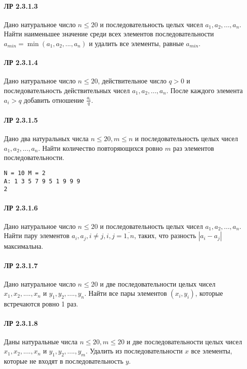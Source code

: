 \documentclass[12pt,a4paper]{report}
\begin{document}
\paragraph*{ЛР 2.3.1.3} Дано натуральное число $n \le 20$ и последовательность целых чисел $a_1, a_2, ..., a_n$. Найти наименьшее значение среди всех элементов последовательности $a_{min} = \min(a_1, a_2, ..., a_n)$ и удалить все элементы, равные $a_{min}$.
\paragraph*{ЛР 2.3.1.4} Дано натуральное число $n \le 20$, действительное число $q>0$ и последовательность действительных чисел $a_1, a_2, ..., a_n$. После каждого элемента $a_i > q$ добавить отношение $\frac {a_i}{q}$.
\paragraph*{ЛР 2.3.1.5} Дано два натуральных числа $n \le 20, m \le n$ и последовательность целых чисел $a_1, a_2, ..., a_n$. Найти количество повторяющихся ровно $m$ раз элементов последовательности.
\begin{verbatim}
N = 10 M = 2
A: 1 3 5 7 9 5 1 9 9 9
2
\end{verbatim}
\paragraph*{ЛР 2.3.1.6} Дано натуральное число $n \le 20$ и последовательность целых чисел $a_1, a_2, ..., a_n$. Найти пару элементов $a_i, a_j, i \ne j, i,j=\overline{1,n}$, таких, что разность $|a_i-a_j|$ максимальна.

\paragraph*{ЛР 2.3.1.7} Дано натуральное число $n \le 20$ и две последовательности целых чисел $x_1, x_2, ...., x_n$ и $y_1, y_2, ...., y_n$. Найти все пары элементов $(x_i, y_i)$, которые встречаются ровно 1 раз.

\paragraph*{ЛР 2.3.1.8} Даны натуральные числа $n \le 20, m \le 20$ и две последовательности целых чисел $x_1, x_2, ...., x_n$ и $y_1, y_2, ...., y_m$. Удалить из последовательности $x$ все элементы, которые не входят в последовательность $y$.

\clearpage
\end{document}
